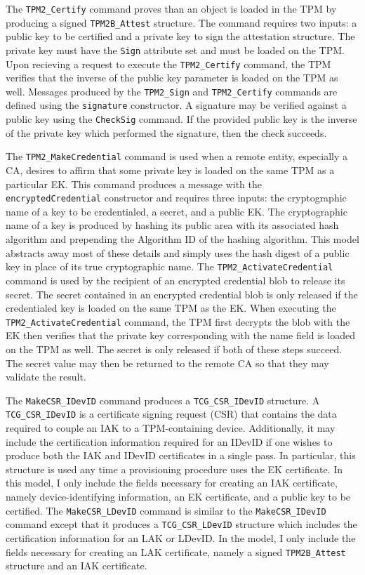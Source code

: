\documentclass[runningheads]{llncs}
\begin{document}
The \verb|TPM2_Certify| command proves than an object is loaded in the TPM by producing a signed \verb|TPM2B_Attest| structure. The command requires two inputs: a public key to be certified and a private key to sign the attestation structure. The private key must have the \verb|Sign| attribute set and must be loaded on the TPM. Upon recieving a request to execute the \verb|TPM2_Certify| command, the TPM verifies that the inverse of the public key parameter is loaded on the TPM as well. Messages produced by the \verb|TPM2_Sign| and \verb|TPM2_Certify| commands are defined using the \verb|signature| constructor. A signature may be verified against a public key using the \verb|CheckSig| command. If the provided public key is the inverse of the private key which performed the signature, then the check succeeds.

The \verb|TPM2_MakeCredential| command is used when a remote entity, especially a CA, desires to affirm that some private key is loaded on the same TPM as a particular EK. This command produces a message with the \verb|encryptedCredential| constructor and requires three inputs: the cryptographic name of a key to be credentialed, a secret, and a public EK. The cryptographic name of a key is produced by hashing its public area with its associated hash algorithm and prepending the Algorithm ID of the hashing algorithm. This model abstracts away most of these details and simply uses the hash digest of a public key in place of its true cryptographic name.   
The \verb|TPM2_ActivateCredential| command is used by the recipient of an encrypted credential blob to release its secret. 
The secret contained in an encrypted credential blob is only released if the credentialed key is loaded on the same TPM as the EK.
When executing the \verb|TPM2_ActivateCredential| command, the TPM first decrypts the blob with the EK then verifies that the private key corresponding with the name field is loaded on the TPM as well. The secret is only released if both of these steps succeed. The secret value may then be returned to the remote CA so that they may validate the result.

The \verb|MakeCSR_IDevID| command produces a \verb|TCG_CSR_IDevID| structure.
 A \verb|TCG_CSR_IDevID| is a certificate signing request (CSR) that contains the data required to couple an IAK to a TPM-containing device. Additionally, it may include the certification information required for an IDevID if one wishes to produce both the IAK and IDevID certificates in a single pass. In particular, this structure is used any time a provisioning procedure uses the EK certificate.  In this model, I only include the fields necessary for creating an IAK certificate, namely device-identifying information, an EK certificate, and a public key to be certified. The \verb|MakeCSR_LDevID| command is similar to the \verb|MakeCSR_IDevID| command except that it produces a \verb|TCG_CSR_LDevID| structure which includes the certification information for an LAK or LDevID. In the model, I only include the fields necessary for creating an LAK certificate, namely a signed \verb|TPM2B_Attest| structure and an IAK certificate.
\end{document}
